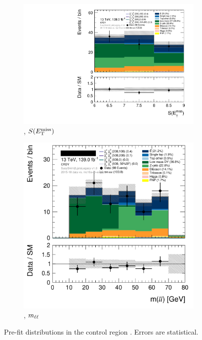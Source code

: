 \begin{figure}[tp]
\centering
\begin{subfigure}{0.48\textwidth}
\centering
\includegraphics[width=\textwidth]{figures/2ljets_def_met_Sign_CRDY.pdf}
\caption{\crdy, $S(E_\mathrm{T}^\mathrm{miss})$}
\end{subfigure}
\hfill
\begin{subfigure}{0.48\textwidth}
\centering
\includegraphics[width=\textwidth]{figures/2ljets_def_mll_CRDY.png}
\caption{\crdy, $m_{\ell\ell}$}
\end{subfigure}
\caption[
Pre-fit distributions in the control region CR-DY
]{%
Pre-fit distributions in the control region \crdy.
Errors are statistical.
}
\label{fig:2ljets_offshell_cr_region}
\end{figure}

